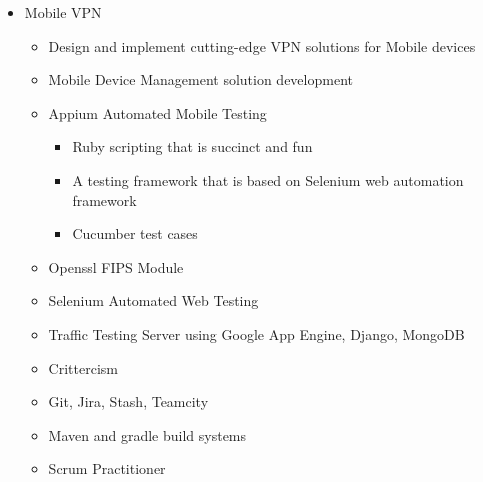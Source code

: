 \documentclass[11pt,a4paper,sans]{moderncv}        %
\begin{document}
\begin{itemize}%
\item Mobile VPN
  \begin{itemize}%
  \item Design and implement cutting-edge VPN solutions for Mobile devices
  \item Mobile Device Management solution development
  \item Appium Automated Mobile Testing
      \begin{itemize}%
      \item Ruby scripting that is succinct and fun
      \item A testing framework that is based on Selenium web automation framework
      \item Cucumber test cases
      \end{itemize}
  \item Openssl FIPS Module
  \item Selenium Automated Web Testing
  \item Traffic Testing Server using Google App Engine, Django, MongoDB
  \item Crittercism
  \item Git, Jira, Stash, Teamcity
  \item Maven and gradle build systems
  \item Scrum Practitioner
  \end{itemize}
\end{itemize}
\end{document}
